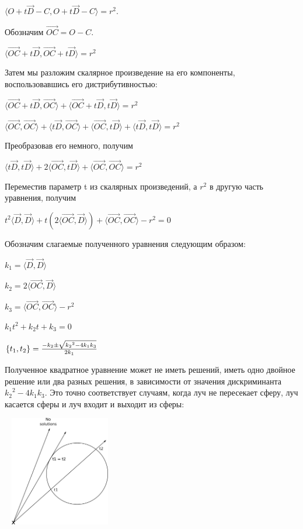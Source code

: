$\langle O + t\vec{D} - C, O + t\vec{D} - C \rangle = r^2$.

Обозначим $\vec{OC} = O - C$.

$\langle \vec{OC} + t\vec{D}, \vec{OC} + t\vec{D} \rangle = r^2$

Затем мы разложим скалярное произведение на его компоненты, воспользовавшись его дистрибутивностью:

$\langle \vec{OC} + t\vec{D}, \vec{OC} \rangle + \langle \vec{OC} + t\vec{D}, t\vec{D} \rangle = r^2$

$\langle \vec{OC}, \vec{OC} \rangle + \langle t\vec{D}, \vec{OC} \rangle + \langle \vec{OC}, t\vec{D} \rangle + \langle t\vec{D}, t\vec{D} \rangle = r^2$

Преобразовав его немного, получим

$\langle t\vec{D}, t\vec{D} \rangle + 2\langle \vec{OC}, t\vec{D} \rangle + \langle \vec{OC}, \vec{OC} \rangle = r^2$

Переместив параметр t из скалярных произведений, а $r^2$ в другую часть уравнения, получим

$t^2 \langle \vec{D}, \vec{D} \rangle + t(2\langle \vec{OC}, \vec{D} \rangle) + \langle \vec{OC}, \vec{OC} \rangle - r^2 = 0$

Обозначим слагаемые полученного уравнения следующим образом:

$k_1 = \langle \vec{D}, \vec{D} \rangle$

$k_2 = 2\langle \vec{OC}, \vec{D} \rangle$

$k_3 = \langle \vec{OC}, \vec{OC} \rangle - r^2$

$k_1t^2 + k_2t + k_3 = 0$

$\{ t_1, t_2 \} = {{-k_2 \pm \sqrt{ {k_2}^2 -4k_1k_3} \over {2k_1}}}$

Полученное квадратное уравнение может не иметь решений, иметь одно двойное решение или два разных решения, в зависимости от значения дискриминанта ${k_2}^2 -4k_1k_3$. Это точно соответствует случаям, когда луч не пересекает сферу, луч касается сферы и луч входит и выходит из сферы:

\includegraphics[width=5cm, height=4.8cm]{solutions.png}

